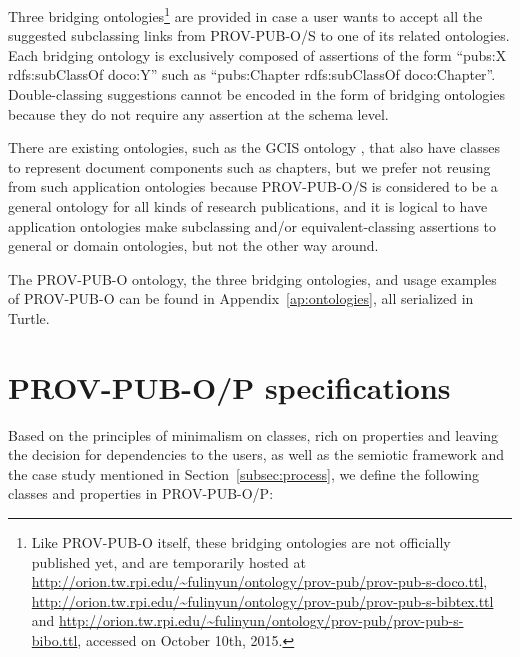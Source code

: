 Three bridging 
ontologies\footnote{Like PROV-PUB-O itself, these bridging ontologies are not officially published yet, and are temporarily hosted at \url{http://orion.tw.rpi.edu/~fulinyun/ontology/prov-pub/prov-pub-s-doco.ttl}, \url{http://orion.tw.rpi.edu/~fulinyun/ontology/prov-pub/prov-pub-s-bibtex.ttl} and 
	\url{http://orion.tw.rpi.edu/~fulinyun/ontology/prov-pub/prov-pub-s-bibo.ttl}, accessed on October 10th, 2015.} are provided in case a user wants to accept all the suggested subclassing links from
PROV-PUB-O/S to one of its related ontologies. Each bridging ontology is exclusively composed of assertions of the form ``pubs:X rdfs:subClassOf doco:Y'' 
such as ``pubs:Chapter rdfs:subClassOf doco:Chapter''. Double-classing suggestions cannot be encoded in the form of bridging ontologies because they do 
not require any assertion at the schema level.

There are existing ontologies, such as the GCIS ontology \cite{ma2014ontology}, that also have classes to represent document components such as chapters, but we prefer not reusing from such application ontologies because PROV-PUB-O/S is considered to be a general ontology for all kinds of research publications, and it is logical to have application ontologies make subclassing and/or equivalent-classing assertions to general or domain ontologies, but not the other way around.

The PROV-PUB-O ontology, the three bridging ontologies, and usage examples of PROV-PUB-O can be found in Appendix~\ref{ap:ontologies}, all serialized in Turtle.

\section{PROV-PUB-O/P specifications}
Based on the principles of minimalism on classes, rich on properties and leaving the decision for dependencies to the users, as well as the semiotic framework and the case study mentioned in Section~\ref{subsec:process}, we define the following classes and properties in PROV-PUB-O/P:

